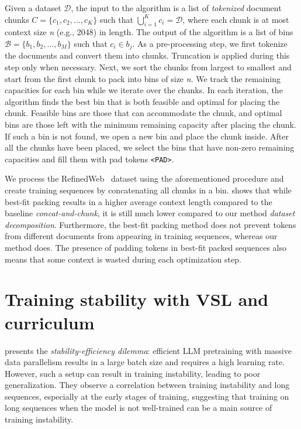 Given a dataset $\mathcal{D}$, the input to the algorithm is a list of {\it tokenized} document chunks $C = \{c_1, c_2, \ldots, c_K\}$ such that $\bigcup_{i=1}^K c_i = \mathcal{D}$, where each chunk is at most context size {\it n} (e.g., 2048) in length. The output of the algorithm is a list of bins $\mathcal{B} = \{b_1, b_2, \ldots, b_M\}$ such that $c_i \in b_j$. As a pre-processing step, we first tokenize the documents and convert them into chunks. Truncation is applied during this step only when necessary. Next, we sort the chunks from largest to smallest and start from the first chunk to pack into bins of size {\it n}. We track the remaining capacities for each bin while we iterate over the chunks. In each iteration, the algorithm finds the best bin that is both feasible and optimal for placing the chunk. Feasible bins are those that can accommodate the chunk, and optimal bins are those left with the minimum remaining capacity after placing the chunk. If such a bin is not found, we open a new bin and place the chunk inside. After all the chunks have been placed, we select the bins that have non-zero remaining capacities and fill them with pad tokens \verb|<PAD>|.

We process the RefinedWeb~\citep{refinedweb} dataset using the aforementioned procedure and create training sequences by concatenating all chunks in a bin.  shows that while best-fit packing results in a higher average context length compared to the baseline {\it concat-and-chunk}, it is still much lower compared to our method {\it dataset decomposition}. Furthermore, the best-fit packing method does not prevent tokens from different documents from appearing in training sequences, whereas our method does. The presence of padding tokens in best-fit packed sequences also means that some context is wasted during each optimization step.


\section{Training stability with VSL and curriculum}\label{sec:stability}

\cite{li2022stability} presents the \emph{stability-efficiency dilemma}: efficient LLM pretraining with massive data parallelism results in a large batch size and requires a high learning rate. However, such a setup can result in training instability, leading to poor generalization. They observe a correlation between training instability and long sequences, especially at the early stages of training, suggesting that training on long sequences when the model is not well-trained can be a main source of training instability.

